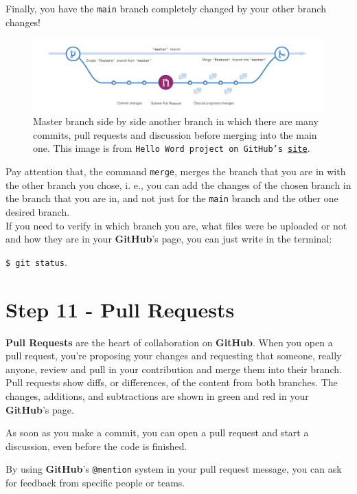 \documentclass[12pt,a4paper,titlepage,brazil]{article}
\begin{document}
{Finally, you have the \texttt{main} branch completely changed by your other branch changes!

\begin{figure}[h!]
 \centering 
 \includegraphics[scale=0.24]{branching.png}
 \caption{Master branch side by side another branch in which there are many commits, pull requests and discussion before merging into the main one. This image is from \texttt{Hello Word project on GitHub's \href{https://guides.github.com/activities/hello-world/branching.png}{site}}.}
\end{figure}

Pay attention that, the command \texttt{merge}, merges the branch that you are in with the other branch you chose, i. e., you can add the changes of the chosen branch in the branch that you are in, and not just for the \texttt{main} branch and the other one desired branch.\\

If you need to verify in which branch you are, what files were be uploaded or not and how they are in your {\bf GitHub}'s page, you can just write in the terminal:

\texttt{\$ git status}.


\section{Step 11 - Pull Requests}

{\bf Pull Requests} are the heart of collaboration on {\bf GitHub}. When you open a pull request, you’re proposing your changes and requesting that someone, really anyone, review and pull in your contribution and merge them into their branch. Pull requests show diffs, or differences, of the content from both branches. The changes, additions, and subtractions are shown in {\color{green}green} and {\color{red}red} in your {\bf GitHub}'s page.

As soon as you make a commit, you can open a pull request and start a discussion, even before the code is finished.

By using {\bf GitHub}’s \texttt{@mention} system in your pull request message, you can ask for feedback from specific people or teams.

}
\end{document}
